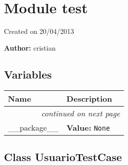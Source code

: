 %
%
%


\section{Module test}

    \label{test}
Created on 20/04/2013

\textbf{Author:} cristian





  \subsection{Variables}

    \vspace{-1cm}
\hspace{\varindent}\begin{longtable}{|p{\varnamewidth}|p{\vardescrwidth}|l}
\cline{1-2}
\cline{1-2} \centering \textbf{Name} & \centering \textbf{Description}& \\
\cline{1-2}
\endhead\cline{1-2}\multicolumn{3}{r}{\small\textit{continued on next page}}\\\endfoot\cline{1-2}
\endlastfoot\raggedright \_\-\_\-p\-a\-c\-k\-a\-g\-e\-\_\-\_\- & \raggedright \textbf{Value:} 
{\tt None}&\\
\cline{1-2}
\end{longtable}



\subsection{Class UsuarioTestCase}

